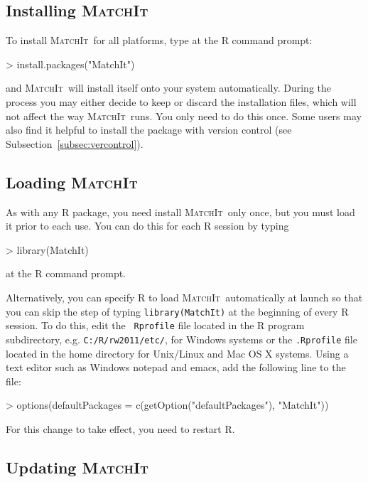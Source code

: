 \documentclass[oneside,letterpaper,titlepage]{article}
\newcommand{\MatchIt}{\textsc{MatchIt}}
\begin{document}
\subsection{Installing \MatchIt}
\label{subsec:install}

To install \MatchIt\ for all platforms, type at the R command prompt:
\begin{Schunk}
\begin{Sinput}
> install.packages("MatchIt")
\end{Sinput}
\end{Schunk}
and \MatchIt\ will install itself onto your system automatically.
During the process you may either decide to keep or discard the
installation files, which will not affect the way \MatchIt\ runs.  You
only need to do this once.  Some users may also find it helpful to
install the package with version control (see
Subsection~\ref{subsec:vercontrol}).

\subsection{Loading \MatchIt}
\label{subsec:load}

As with any R package, you need install \MatchIt\ only once, but you
must load it prior to each use.  You can do this for each R session by
typing
\begin{Schunk}
\begin{Sinput}
> library(MatchIt)
\end{Sinput}
\end{Schunk}
at the R command prompt.  

Alternatively, you can specify R to load \MatchIt\ automatically at
launch so that you can skip the step of typing {\tt library(MatchIt)}
at the beginning of every R session.  To do this, edit the {\tt
  Rprofile} file located in the R program subdirectory, e.g.
\texttt{C:/R/rw2011/etc/}, for Windows systems or the {\tt .Rprofile}
file located in the home directory for Unix/Linux and Mac OS X
systems.  Using a text editor such as Windows notepad and emacs, add
the following line to the file:
\begin{Schunk}
\begin{Sinput}
> options(defaultPackages = c(getOption("defaultPackages"), "MatchIt"))
\end{Sinput}
\end{Schunk}
For this change to take effect, you need to restart R.

\subsection{Updating \MatchIt}
\end{document}
